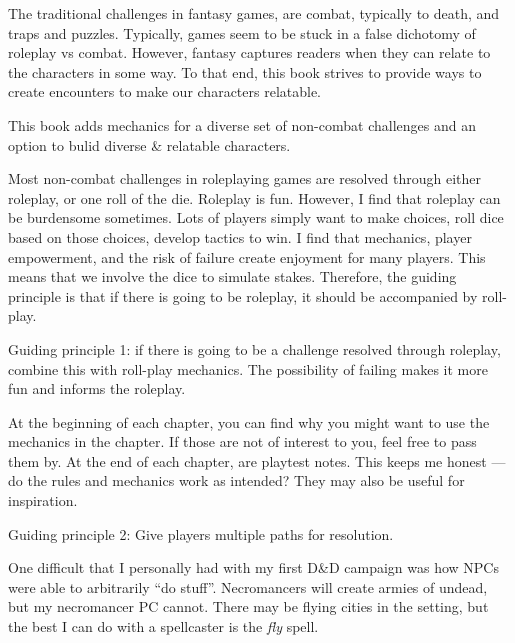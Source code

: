 \documentclass[twocolumn]{dndbook}
\begin{document}
The traditional challenges in fantasy games, are combat, typically to death, and traps and puzzles.
Typically, games seem to be stuck in a false dichotomy of roleplay vs combat.
However, fantasy captures readers when they can relate to the characters in some way.
To that end, this book strives to provide ways to create encounters to make our characters relatable.\par

\begin{emphasisParagraph}
This book adds mechanics for a diverse set of non-combat challenges and an option to bulid diverse \& relatable characters.
\end{emphasisParagraph}

Most non-combat challenges in roleplaying games are resolved through either roleplay, or one roll of the die.
Roleplay is fun. However, I find that roleplay can be burdensome sometimes.
Lots of players simply want to make choices, roll dice based on those choices, develop tactics to win.
I find that mechanics, player empowerment, and the risk of failure create enjoyment for many players.
This means that we involve the dice to simulate stakes.
Therefore, the guiding principle is that if there is going to be roleplay, it should be accompanied by roll-play.\par

\begin{emphasisParagraph}
	Guiding principle 1: if there is going to be a challenge resolved through roleplay, combine this with roll-play mechanics.
	The possibility of failing makes it more fun and informs the roleplay.
\end{emphasisParagraph}

At the beginning of each chapter, you can find why you might want to use the mechanics in the chapter.
If those are not of interest to you, feel free to pass them by.
At the end of each chapter, are playtest notes.
This keeps me honest --- do the rules and mechanics work as intended?
They may also be useful for inspiration.\par

\begin{emphasisParagraph}
	Guiding principle 2: Give players multiple paths for resolution.
\end{emphasisParagraph}

One difficult that I personally had with my first D\&D campaign was how NPCs were able to arbitrarily ``do stuff''.
Necromancers will create armies of undead, but my necromancer PC cannot.
There may be flying cities in the setting, but the best I can do with a spellcaster is the \emph{fly} spell.
\end{document}
